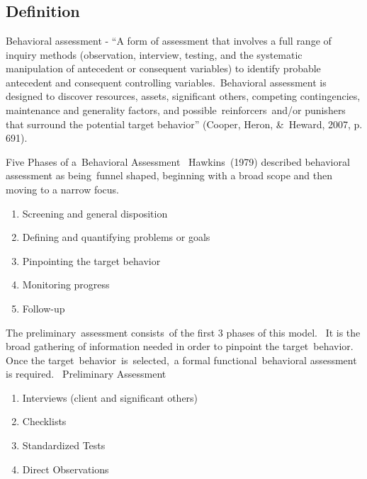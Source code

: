 \clearpage \section[\fourgThree{}]{\fourgThree{}%
              }
\subsection{Definition}
Behavioral assessment - ``A form of assessment that involves a full range of inquiry methods (observation, interview, testing, and the systematic manipulation of antecedent or consequent variables) to identify probable antecedent and consequent controlling variables. Behavioral assessment is designed to discover resources, assets, significant others, competing contingencies, maintenance and generality factors, and possible reinforcers and/or punishers that surround the potential target behavior'' (Cooper, Heron, \& Heward, 2007, p. 691).

Five Phases of a Behavioral Assessment 
Hawkins (1979) described behavioral assessment as being funnel shaped, beginning with a broad scope and then moving to a narrow focus.  
\begin{enumerate}
\item Screening and general disposition
\item Defining and quantifying problems or goals
\item  Pinpointing the target behavior
\item Monitoring progress
\item Follow-up
\end{enumerate}

The preliminary assessment consists of the first 3 phases of this model.  It is the broad gathering of information needed in order to pinpoint the target behavior. Once the target behavior is selected, a formal functional behavioral assessment is required. 
% 
Preliminary Assessment\\
\begin{enumerate}
\item Interviews (client and significant others) 
\item Checklists  
\item Standardized Tests 
\item Direct Observations  
\end{enumerate}

